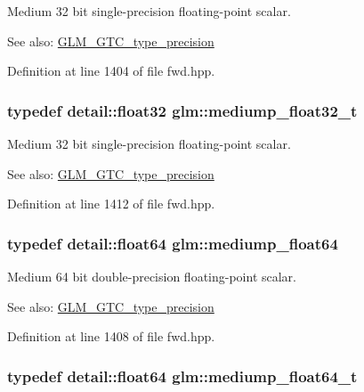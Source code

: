 Medium 32 bit single-precision floating-point scalar. \begin{Desc}
\item[See also:]\hyperlink{group__gtc__type__precision}{GLM\_\-GTC\_\-type\_\-precision} \end{Desc}


Definition at line 1404 of file fwd.hpp.\hypertarget{group__gtc__type__precision_gcbd406715148db96c9d9d2a2ef6460de}{
\subsubsection[mediump\_\-float32\_\-t]{\setlength{\rightskip}{0pt plus 5cm}typedef detail::float32 {\bf glm::mediump\_\-float32\_\-t}}}
\label{group__gtc__type__precision_gcbd406715148db96c9d9d2a2ef6460de}


Medium 32 bit single-precision floating-point scalar. \begin{Desc}
\item[See also:]\hyperlink{group__gtc__type__precision}{GLM\_\-GTC\_\-type\_\-precision} \end{Desc}


Definition at line 1412 of file fwd.hpp.\hypertarget{group__gtc__type__precision_g9225ae6aed0f90b6eb65bf8d466199c1}{
\subsubsection[mediump\_\-float64]{\setlength{\rightskip}{0pt plus 5cm}typedef detail::float64 {\bf glm::mediump\_\-float64}}}
\label{group__gtc__type__precision_g9225ae6aed0f90b6eb65bf8d466199c1}


Medium 64 bit double-precision floating-point scalar. \begin{Desc}
\item[See also:]\hyperlink{group__gtc__type__precision}{GLM\_\-GTC\_\-type\_\-precision} \end{Desc}


Definition at line 1408 of file fwd.hpp.\hypertarget{group__gtc__type__precision_g97a0747b103eb5ef320a91888de52f51}{
\subsubsection[mediump\_\-float64\_\-t]{\setlength{\rightskip}{0pt plus 5cm}typedef detail::float64 {\bf glm::mediump\_\-float64\_\-t}}}
\label{group__gtc__type__precision_g97a0747b103eb5ef320a91888de52f51}


